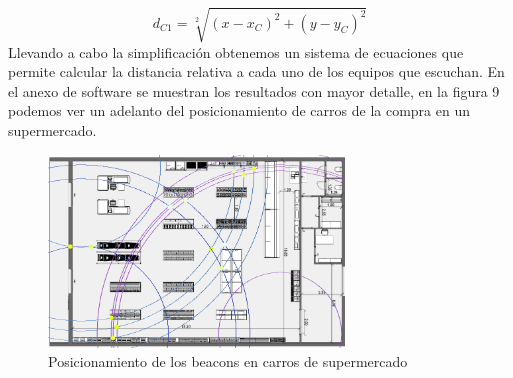 \documentclass[a4paper ,12pt, onecolumn]{article}
\begin{document}
                \begin{equation}
                    d_{C1}= \sqrt[2]{(x-x_C)^2+(y-y_C)^2}
                \end{equation}
                Llevando a cabo la simplificación obtenemos un sistema de ecuaciones que permite calcular la distancia
                relativa a cada uno de los equipos que escuchan. En el anexo de software se muestran los resultados con mayor 
                detalle, en la figura 9 podemos ver un adelanto del posicionamiento de carros de la compra en un supermercado.
                \begin{center}
                    \begin{figure}[h]
                        \centering
                        \includegraphics[width=0.7\textwidth]{agrupation_3.PNG}
                        \caption{Posicionamiento de los beacons en carros de supermercado}
                        \label{fig:mesh7}
                    \end{figure}
                \end{center}
                \paragraph{}
\end{document}
